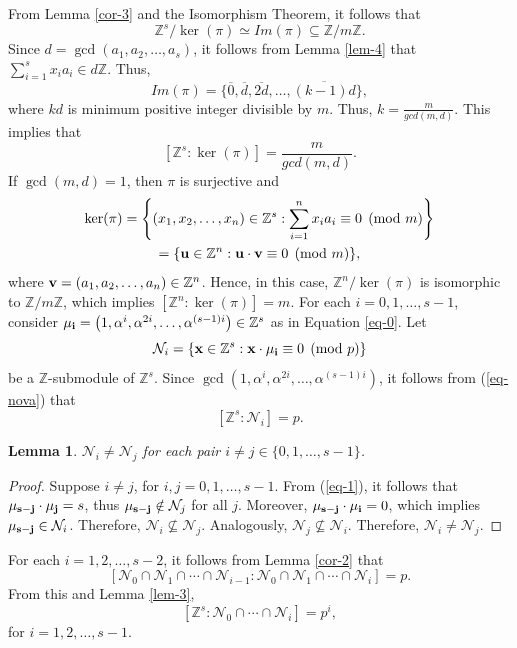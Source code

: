 \documentclass{amsart}
\newtheorem{lemma}[theorem]{Lemma}
\begin{document}
From Lemma \ref{cor-3} and the Isomorphism Theorem, it follows that \[ \mathbb{Z}^s/\ker(\pi) \simeq Im(\pi)\subseteq \mathbb{Z}/m\mathbb{Z}. \] Since $d=\gcd(a_1,a_2,\ldots,a_s)$, it follows from Lemma \ref{lem-4} that $\sum_{i=1}^s x_ia_i \in d\mathbb{Z}$. Thus, \[ Im(\pi) =\{\overline{0},\overline{d},\overline{2d},\ldots,\overline{(k-1)d}\}, \] where $kd$ is minimum positive integer divisible by $m$. Thus, $k=\frac{m}{gcd(m,d)}$. This implies that \[ [\mathbb{Z}^s:\ker(\pi)] = \frac{m}{gcd(m,d)}. \] If $\gcd(m,d)=1$, then $\pi$ is surjective and
\begin{multline}\label{eq-nova}
   \ker(\pi)=\left\{(x_1,x_2,\ldots,x_n)\in\mathbb{Z}^s:\displaystyle \sum_{i=1}^n x_ia_i\equiv 0 \pmod m\right\}\\
   = \{{\bf u}\in\mathbb{Z}^n:{\bf u}\cdot{\bf v}\equiv 0 \pmod m\},
\end{multline}
where ${\bf v}=(a_1,a_2,\ldots,a_n)\in\mathbb{Z}^n$. Hence, in this case, $\mathbb{Z}^n/\ker(\pi)$ is isomorphic to $\mathbb{Z}/m\mathbb{Z}$, which implies $[\mathbb{Z}^n:\ker(\pi)]=m$.
For each $i=0,1,\ldots,s-1$, consider ${\bf \mu_i}= \left(1,\alpha^i,\alpha^{2i},\ldots,\alpha^{(s-1)i}\right) \in \mathbb{Z}^s$ as in Equation \ref{eq-0}. Let \[ \mathcal{N}_i=\{{\bf x}\in\mathbb{Z}^s: {\bf x}\cdot{\bf \mu_i}\equiv 0 \pmod p\} \] be a $\mathbb{Z}$-submodule of $\mathbb{Z}^s$. Since $\gcd(1,\alpha^i,\alpha^{2i},\ldots,\alpha^{(s-1)i})$, it follows from (\ref{eq-nova}) that $$[\mathbb{Z}^s:\mathcal{N}_i]=p.$$

\begin{lemma} \label{lem-5} $\mathcal{N}_i\neq \mathcal{N}_j$ for each pair $i\neq j\in\{0,1,\ldots,s-1\}$. \end{lemma} \begin{proof} Suppose $i\neq j$, for $i,j=0,1,\ldots,s-1$. From (\ref{eq-1}), it follows that ${\bf \mu_{s-j}}\cdot{\bf \mu_j}=s$, thus ${\bf \mu_{s-j}}\notin \mathcal{N}_j$ for all $j$. Moreover, ${\bf \mu_{s-j}}\cdot{\bf \mu_i}=0$, which implies ${\bf \mu_{s-j}}\in\mathcal{N}_i$. Therefore, $\mathcal{N}_i\not\subseteq \mathcal{N}_j$. Analogously, $\mathcal{N}_j\not\subseteq \mathcal{N}_i$. Therefore, $\mathcal{N}_i\neq \mathcal{N}_j$. \end{proof}

For each $i=1,2,\ldots,s-2$, it follows from Lemma \ref{cor-2} that
\[[\mathcal{N}_0\cap\mathcal{N}_1\cap\cdots\cap\mathcal{N}_{i-1}:\mathcal{N}_0\cap\mathcal{N}_1\cap\cdots\cap\mathcal{N}_{i}]=p.  \]
From this and Lemma \ref{lem-3}, 
\begin{equation}\label{eq-nova2}
   [\mathbb{Z}^s:\mathcal{N}_0\cap\cdots\cap\mathcal{N}_{i}]=p^i,
\end{equation}
for $i=1,2,\ldots,s-1$.
\end{document}
